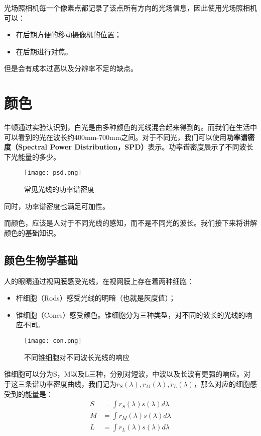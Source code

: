 \documentclass[openany]{progbookcn}
\begin{document}
光场照相机每一个像素点都记录了该点所有方向的光场信息，因此使用光场照相机可以：
\begin{itemize}
	\item 在后期方便的移动摄像机的位置；
	\item 在后期进行对焦。
\end{itemize}

但是会有成本过高以及分辨率不足的缺点。

\chapter{颜色}

牛顿通过实验认识到，白光是由多种颜色的光线混合起来得到的。而我们在生活中可以看到的光在波长约400mm-700mm之间。对于不同光，我们可以使用\textbf{功率谱密度（Spectral Power Distribution，SPD）}表示。功率谱密度展示了不同波长下光能量的多少。

\begin{figure}[H]
	\centering
	\texttt{[image: psd.png]}
	\caption{常见光线的功率谱密度}
	\label{fig:psd}
\end{figure}

同时，功率谱密度也满足可加性。

而颜色，应该是人对于不同光线的感知，而不是不同光的波长。我们接下来将讲解颜色的基础知识。

\section{颜色生物学基础}

人的眼睛通过视网膜感受光线，在视网膜上存在着两种细胞：
\begin{itemize}
	\item 杆细胞（Rods）感受光线的明暗（也就是灰度值）；
	\item 锥细胞（Cones）感受颜色。锥细胞分为三种类型，对不同的波长的光线的响应不同。
\end{itemize}

\begin{figure}[H]
	\centering
	\texttt{[image: con.png]}
	\caption{不同锥细胞对不同波长光线的响应}
	\label{fig:con}
\end{figure}

锥细胞可以分为S，M以及L三种，分别对短波，中波以及长波有更强的响应。对于这三条谱功率密度曲线，我们记为$r_S(\lambda),r_M(\lambda),r_L(\lambda)$，那么对应的细胞感受到的能量是：
\begin{equation}
	\begin{split}
		S &=\int r_{S}(\lambda) s(\lambda) d \lambda \\
		M &=\int r_{M}(\lambda) s(\lambda) d \lambda \\
		L &=\int r_{L}(\lambda) s(\lambda) d \lambda
	\end{split}
\end{equation}
\end{document}
